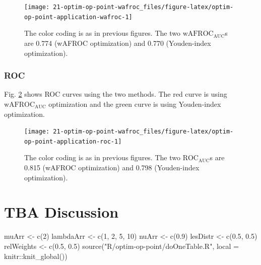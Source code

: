 \documentclass[
]{book}
\newenvironment{Shaded}{\begin{snugshade}}{\end{snugshade}}
\newcommand{\AttributeTok}[1]{\textcolor[rgb]{0.77,0.63,0.00}{#1}}
\newcommand{\DecValTok}[1]{\textcolor[rgb]{0.00,0.00,0.81}{#1}}
\newcommand{\FloatTok}[1]{\textcolor[rgb]{0.00,0.00,0.81}{#1}}
\newcommand{\FunctionTok}[1]{\textcolor[rgb]{0.00,0.00,0.00}{#1}}
\newcommand{\NormalTok}[1]{#1}
\newcommand{\OtherTok}[1]{\textcolor[rgb]{0.56,0.35,0.01}{#1}}
\newcommand{\SpecialCharTok}[1]{\textcolor[rgb]{0.00,0.00,0.00}{#1}}
\newcommand{\StringTok}[1]{\textcolor[rgb]{0.31,0.60,0.02}{#1}}
\begin{document}
\begin{figure}

{\centering \texttt{[image: 21-optim-op-point-wafroc\_files/figure-latex/optim-op-point-application-wafroc-1]} 

}

\caption{The color coding is as in previous figures. The two $\text{wAFROC}_\text{AUC}$s are 0.774 (wAFROC optimization) and 0.770 (Youden-index optimization).}\label{fig:optim-op-point-application-wafroc}
\end{figure}

\hypertarget{roc-2}{%
\subsubsection{ROC}\label{roc-2}}

Fig. \ref{fig:optim-op-point-application-roc} shows ROC curves using the two methods. The red curve is using \(\text{wAFROC}_\text{AUC}\) optimization and the green curve is using Youden-index optimization.

\begin{figure}

{\centering \texttt{[image: 21-optim-op-point-wafroc\_files/figure-latex/optim-op-point-application-roc-1]} 

}

\caption{The color coding is as in previous figures. The two $\text{ROC}_\text{AUC}$s are 0.815 (wAFROC optimization) and 0.798 (Youden-index optimization).}\label{fig:optim-op-point-application-roc}
\end{figure}

\hypertarget{optim-op-point-discussion}{%
\section{TBA Discussion}\label{optim-op-point-discussion}}

\begin{Shaded}
\begin{Highlighting}[]
\NormalTok{muArr }\OtherTok{\textless{}{-}} \FunctionTok{c}\NormalTok{(}\DecValTok{2}\NormalTok{)}
\NormalTok{lambdaArr }\OtherTok{\textless{}{-}} \FunctionTok{c}\NormalTok{(}\DecValTok{1}\NormalTok{, }\DecValTok{2}\NormalTok{, }\DecValTok{5}\NormalTok{, }\DecValTok{10}\NormalTok{)}
\NormalTok{nuArr }\OtherTok{\textless{}{-}} \FunctionTok{c}\NormalTok{(}\FloatTok{0.9}\NormalTok{)}
\NormalTok{lesDistr }\OtherTok{\textless{}{-}} \FunctionTok{c}\NormalTok{(}\FloatTok{0.5}\NormalTok{, }\FloatTok{0.5}\NormalTok{)}
\NormalTok{relWeights }\OtherTok{\textless{}{-}} \FunctionTok{c}\NormalTok{(}\FloatTok{0.5}\NormalTok{, }\FloatTok{0.5}\NormalTok{)}
\FunctionTok{source}\NormalTok{(}\StringTok{"R/optim{-}op{-}point/doOneTable.R"}\NormalTok{, }\AttributeTok{local =}\NormalTok{ knitr}\SpecialCharTok{::}\FunctionTok{knit\_global}\NormalTok{())}
\end{Highlighting}
\end{Shaded}
\end{document}

